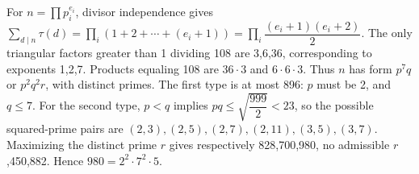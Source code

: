 For $n=\prod p_i^{e_i}$, divisor independence gives $\sum_{d\mid n}\tau(d)=\prod_i(1+2+\cdots+(e_i+1))=\prod_i\dfrac{(e_i+1)(e_i+2)}{2}$. The only triangular factors greater than 1 dividing 108 are 3,6,36, corresponding to exponents 1,2,7. Products equaling 108 are $36\cdot3$ and $6\cdot6\cdot3$. Thus $n$ has form $p^7q$ or $p^2q^2r$, with distinct primes. The first type is at most 896: $p$ must be 2, and $q\le7$. For the second type, $p<q$ implies $pq\le\sqrt{\dfrac{999}{2}}<23$, so the possible squared-prime pairs are $(2,3),(2,5),(2,7),(2,11),(3,5),(3,7)$. Maximizing the distinct prime $r$ gives respectively 828,700,980, no admissible $r$,450,882. Hence $\boxed{980=2^2\cdot7^2\cdot5}$.
